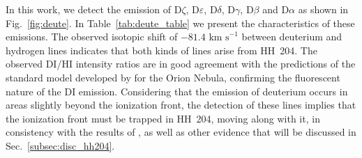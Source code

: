 \documentclass[twocolumn]{aastex63}
\newcommand{\eduardo}[1]{{\color{teal}E: #1}}
\newcommand{\cesar}[1]{{\color{red}C: #1}}
\begin{document}
In this work, we detect the emission of D$\zeta$, D$\varepsilon$, D$\delta$, D$\gamma$, D$\beta$ and D$\alpha$ as shown in Fig.~\ref{fig:deute}. In Table~\ref{tab:deute_table} we present the characteristics of these emissions. The observed isotopic shift of $-81.4 \text{ km s}^{-1}$ between deuterium and hydrogen lines indicates that both kinds of lines arise from HH~204. The observed D\thinspace I/H\thinspace I intensity ratios are in good agreement with the predictions of the standard model developed by \citet[][]{odell01_deu} for the Orion Nebula, confirming the fluorescent nature of the D\thinspace I emission. Considering that the emission of deuterium occurs in areas slightly beyond the ionization front, the detection of these lines implies that the ionization front must be trapped in HH~204, moving along with it, in consistency with the results of \citet[][]{nunezdiaz12}, as well as other evidence that will be discussed in Sec.~\ref{subsec:disc_hh204}. 







\end{document}

